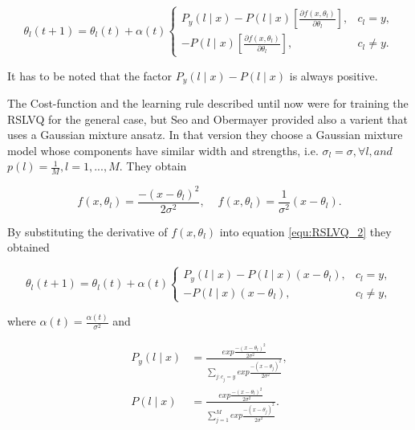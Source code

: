 \documentclass[12pt,oneside,a4paper,parskip]{scrbook}
\begin{document}
\begin{equation}
  \theta_l(t + 1) = \theta_l(t) + \alpha(t) 
  \begin{cases}
    P_y(l\mid x) - P(l\mid x)[\frac{\partial f(x, \theta_l) }{\partial\theta_l}], &c_l = y,  \\
    - P(l\mid x)[\frac{\partial f(x, \theta_l) }{\partial\theta_l}],              &c_l \neq y.              
  \end{cases}
  \label{equ:RSLVQ_2}
\end{equation}

It has to be noted that the factor $P_y(l\mid x) - P(l\mid x)$ is always positive. \cite{RSLVQOrig}

The Cost-function and the learning rule described until now were for training the RSLVQ for the general case, but 
Seo and Obermayer provided also a varient that uses a Gaussian mixture ansatz.
In that version they choose a Gaussian mixture model whose components have similar width and strengths, i.e.
$\sigma_l = \sigma, \forall l, and$ $p(l) = \frac{1}{M}, l = 1, ..., M$. They obtain 

\begin{equation}
  f(x,\theta_l) = \frac{-(x-\theta_l)^2}{2\sigma^2},   \quad   \frac{}{}f(x,\theta_l) = \frac{1}{\sigma^2}(x-\theta_l).
\end{equation}

By substituting the derivative of $f(x,\theta_l)$ into equation \ref{equ:RSLVQ_2} they obtained

\begin{equation}
  \theta_l(t + 1) = \theta_l(t) + \alpha(t) 
  \begin{cases}
    P_y(l\mid x) - P(l\mid x)(x-\theta_l),  &c_l = y,  \\
    - P(l\mid x)(x-\theta_l),               &c_l \neq y,              
  \end{cases}
  \label{equ:RSLVQ_3}
\end{equation}

where $\alpha(t) = \frac{\alpha(t)}{\sigma^2}$ and

\begin{equation}
  \begin{split}
    P_y(l\mid x) &= \frac{exp \frac{-(x-\theta_l)^2}{2\sigma^2}}{\displaystyle\sum_{j:c_j = y} exp \frac{-(x-\theta_j)^2}{2\sigma^2}}, \\
    P(l\mid x) &= \frac{exp \frac{-(x-\theta_l)^2}{2\sigma^2}}{\displaystyle\sum_{j=1}^{M} exp \frac{-(x-\theta_j)^2}{2\sigma^2}}.
  \end{split}
  \label{equ:RSLVQ_4}
\end{equation}
\end{document}
